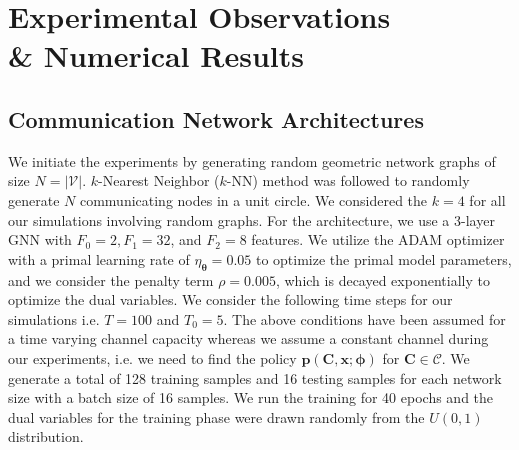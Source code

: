 \documentclass[lettersize,journal]{IEEEtran}
\begin{document}
\section{Experimental Observations \\ \& Numerical Results} \label{sec:results}
\subsection{Communication Network Architectures}
We initiate the experiments by generating random geometric network graphs of size $N=|\mathcal{V}|$. $k$-Nearest Neighbor ($k$-NN) method was followed to randomly generate $N$ communicating nodes in a unit circle. We considered the $k=4$ for all our simulations involving random graphs. %
For the architecture, we use a 3-layer GNN with $F_0 = 2, F_1=32$, and $F_2=8$ features. We utilize the ADAM optimizer with a primal learning rate of $\eta_{\bm{\theta}} = 0.05$ to optimize the primal model parameters, and we consider the penalty term $\rho = 0.005$, which is decayed exponentially to optimize the dual variables. We consider the following time steps for our simulations i.e. $T=100$ and $T_0=5$. The above conditions have been assumed for a time varying channel capacity whereas we assume a constant channel during our experiments, i.e. we need to find the policy $\mathbf{p}(\mathbf{C},\mathbf{x};\bm{\phi})$ for $\mathbf{C} \in \mathcal{C}$. We generate a total of 128 training samples and 16 testing samples for each network size with a batch size of 16 samples. We run the training for 40 epochs and the dual variables for the training phase were drawn randomly from the $U(0,1)$ distribution. %
\end{document}
